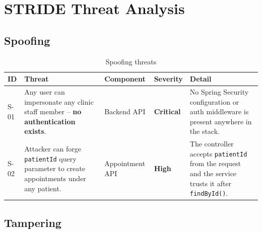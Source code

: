 \documentclass[12pt,a4paper]{report}
\newcommand{\critical}{\textbf{\textcolor{sevcritical}{Critical}}}
\newcommand{\high}{\textbf{\textcolor{sevhigh}{High}}}
\begin{document}
\section{STRIDE Threat Analysis}

\subsection{Spoofing}

\begin{table}[H]
\centering
\caption{Spoofing threats}
\begin{tabularx}{\linewidth}{S{0.8cm} S{3.2cm} S{2.4cm} S{2.1cm} X}
\toprule
\textbf{ID} & \textbf{Threat} & \textbf{Component} & \textbf{Severity} & \textbf{Detail} \\
\midrule
S-01 & Any user can impersonate any clinic staff member -- \textbf{no authentication exists}. & Backend API & \critical & No Spring Security configuration or auth middleware is present anywhere in the stack. \\[6pt]
S-02 & Attacker can forge \texttt{patientId} query parameter to create appointments under any patient. & Appointment API & \high & The controller accepts \texttt{patientId} from the request and the service trusts it after \texttt{findById()}. \\
\bottomrule
\end{tabularx}
\end{table}

\subsection{Tampering}
\end{document}
